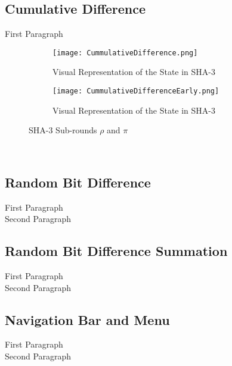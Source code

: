 \subsection{Cumulative Difference}
First Paragraph
\vspace{5mm}\\
\begin{figure}[h!]
\advance\leftskip-2cm
\begin{subfigure}{.6\textwidth}
\texttt{[image: CummulativeDifference.png]}
    \caption{Visual Representation of the State in SHA-3}
    \label{fig:appState}
\end{subfigure}
\advance\rightskip-2cm
\hfill\begin{subfigure}{.6\textwidth}
\texttt{[image: CummulativeDifferenceEarly.png]}
    \caption{Visual Representation of the State in SHA-3}
    \label{fig:appState}
\end{subfigure}
\caption{SHA-3 Sub-rounds $\rho$ and $\pi$}
\label{fig:CummulativeDifference}
\end{figure}
\vspace{5mm}\\
\subsection{Random Bit Difference}
First Paragraph
\vspace{5mm}\\
Second Paragraph
\subsection{Random Bit Difference Summation}
First Paragraph
\vspace{5mm}\\
Second Paragraph
\subsection{Navigation Bar and Menu}
First Paragraph
\vspace{5mm}\\
Second Paragraph